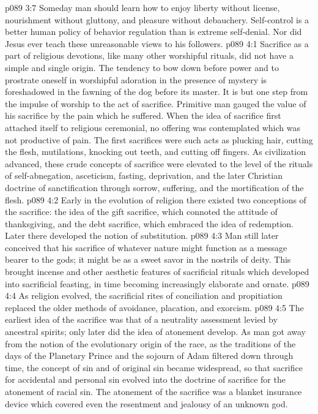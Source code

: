 \vs p089 3:7 \pc Someday man should learn how to enjoy liberty without license, nourishment without gluttony, and pleasure without debauchery. Self\hyp{}control is a better human policy of behavior regulation than is extreme self\hyp{}denial. Nor did Jesus ever teach these unreasonable views to his followers.
\vs p089 4:1 Sacrifice as a part of religious devotions, like many other worshipful rituals, did not have a simple and single origin. The tendency to bow down before power and to prostrate oneself in worshipful adoration in the presence of mystery is foreshadowed in the fawning of the dog before its master. It is but one step from the impulse of worship to the act of sacrifice. Primitive man gauged the value of his sacrifice by the pain which he suffered. When the idea of sacrifice first attached itself to religious ceremonial, no offering was contemplated which was not productive of pain. The first sacrifices were such acts as plucking hair, cutting the flesh, mutilations, knocking out teeth, and cutting off fingers. As civilization advanced, these crude concepts of sacrifice were elevated to the level of the rituals of self\hyp{}abnegation, asceticism, fasting, deprivation, and the later Christian doctrine of sanctification through sorrow, suffering, and the mortification of the flesh.
\vs p089 4:2 Early in the evolution of religion there existed two conceptions of the sacrifice: the idea of the gift sacrifice, which connoted the attitude of thanksgiving, and the debt sacrifice, which embraced the idea of redemption. Later there developed the notion of substitution.
\vs p089 4:3 Man still later conceived that his sacrifice of whatever nature might function as a message bearer to the gods; it might be as a sweet savor in the nostrils of deity. This brought incense and other aesthetic features of sacrificial rituals which developed into sacrificial feasting, in time becoming increasingly elaborate and ornate.
\vs p089 4:4 \pc As religion evolved, the sacrificial rites of conciliation and propitiation replaced the older methods of avoidance, placation, and exorcism.
\vs p089 4:5 The earliest idea of the sacrifice was that of a neutrality assessment levied by ancestral spirits; only later did the idea of atonement develop. As man got away from the notion of the evolutionary origin of the race, as the traditions of the days of the Planetary Prince and the sojourn of Adam filtered down through time, the concept of sin and of original sin became widespread, so that sacrifice for accidental and personal sin evolved into the doctrine of sacrifice for the atonement of racial sin. The atonement of the sacrifice was a blanket insurance device which covered even the resentment and jealousy of an unknown god.
